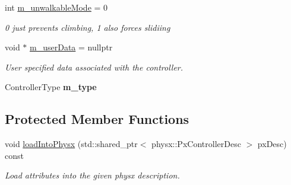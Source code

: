 \begin{Indent}
\begin{DoxyCompactItemize}
\mbox{\label{classrev_1_1_controller_description_a4fc2bd6dcda9910754548a38d6a4a2ae}} 
int \mbox{\hyperlink{classrev_1_1_controller_description_a4fc2bd6dcda9910754548a38d6a4a2ae}{m\+\_\+unwalkable\+Mode}} = 0
\begin{DoxyCompactList}\small\item\em 0 just prevents climbing, 1 also forces slidiing \end{DoxyCompactList}\item 
\mbox{\label{classrev_1_1_controller_description_ab6cee2522f72edb9decfaf8b139e5b30}} 
void $\ast$ \mbox{\hyperlink{classrev_1_1_controller_description_ab6cee2522f72edb9decfaf8b139e5b30}{m\+\_\+user\+Data}} = nullptr
\begin{DoxyCompactList}\small\item\em User specified data associated with the controller. \end{DoxyCompactList}\item 
\mbox{\label{classrev_1_1_controller_description_a03f5cbdd3bf10a6fbde2df5b51633f32}} 
Controller\+Type {\bfseries m\+\_\+type}
\end{DoxyCompactItemize}
\end{Indent}
\subsection*{Protected Member Functions}
\begin{DoxyCompactItemize}
\item 
\mbox{\label{classrev_1_1_controller_description_a7b779b2f48d7aa57801dc23edcfaeca4}} 
void \mbox{\hyperlink{classrev_1_1_controller_description_a7b779b2f48d7aa57801dc23edcfaeca4}{load\+Into\+Physx}} (std\+::shared\+\_\+ptr$<$ physx\+::\+Px\+Controller\+Desc $>$ px\+Desc) const
\begin{DoxyCompactList}\small\item\em Load attributes into the given physx description. \end{DoxyCompactList}\end{DoxyCompactItemize}
